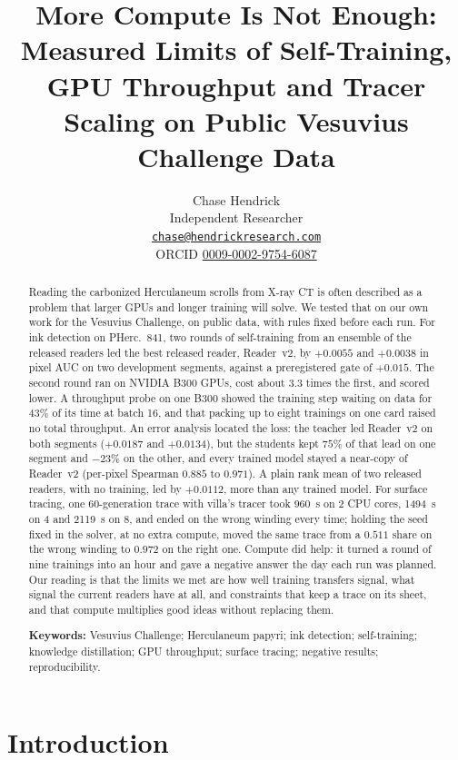 \documentclass[11pt]{article}
\title{More Compute Is Not Enough: Measured Limits of Self-Training, GPU Throughput and Tracer Scaling on Public Vesuvius Challenge Data}
\author{Chase Hendrick\\[0.2em] {\small Independent Researcher}\\ {\small\href{mailto:chase@hendrickresearch.com}{\texttt{chase@hendrickresearch.com}}}\\ {\small ORCID \href{https://orcid.org/0009-0002-9754-6087}{0009-0002-9754-6087}}}
\date{}
\begin{document}
\maketitle

\begin{abstract}
Reading the carbonized Herculaneum scrolls from X-ray CT is often described as a problem that larger GPUs and longer training will solve. We tested that on our own work for the Vesuvius Challenge, on public data, with rules fixed before each run. For ink detection on PHerc.~841, two rounds of self-training from an ensemble of the released readers led the best released reader, Reader~v2, by $+0.0055$ and $+0.0038$ in pixel AUC on two development segments, against a preregistered gate of $+0.015$. The second round ran on NVIDIA B300 GPUs, cost about $3.3$ times the first, and scored lower. A throughput probe on one B300 showed the training step waiting on data for $43\%$ of its time at batch 16, and that packing up to eight trainings on one card raised no total throughput. An error analysis located the loss: the teacher led Reader~v2 on both segments ($+0.0187$ and $+0.0134$), but the students kept $75\%$ of that lead on one segment and $-23\%$ on the other, and every trained model stayed a near-copy of Reader~v2 (per-pixel Spearman $0.885$ to $0.971$). A plain rank mean of two released readers, with no training, led by $+0.0112$, more than any trained model. For surface tracing, one 60-generation trace with villa's tracer took 960~s on 2 CPU cores, 1494~s on 4 and 2119~s on 8, and ended on the wrong winding every time; holding the seed fixed in the solver, at no extra compute, moved the same trace from a $0.511$ share on the wrong winding to $0.972$ on the right one. Compute did help: it turned a round of nine trainings into an hour and gave a negative answer the day each run was planned. Our reading is that the limits we met are how well training transfers signal, what signal the current readers have at all, and constraints that keep a trace on its sheet, and that compute multiplies good ideas without replacing them.

\medskip
\noindent\textbf{Keywords:} Vesuvius Challenge; Herculaneum papyri; ink detection; self-training; knowledge distillation; GPU throughput; surface tracing; negative results; reproducibility.
\end{abstract}

\section{Introduction}
\end{document}
